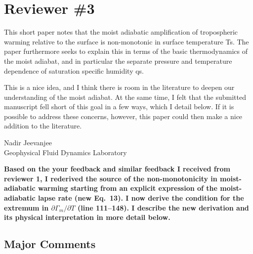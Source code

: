 \documentclass{article}
\begin{document}
\section*{Reviewer \#3}

This short paper notes that the moist adiabatic amplification of tropospheric warming relative to the surface is non-monotonic in surface temperature Ts. The paper furthermore seeks to explain this in terms of the basic thermodynamics of the moist adiabat, and in particular the separate pressure and temperature dependence of saturation specific humidity qs.

This is a nice idea, and I think there is room in the literature to deepen our understanding of the moist adiabat. At the same time, I felt that the submitted manuscript fell short of this goal in a few ways, which I detail below. If it is possible to address these concerns, however, this paper could then make a nice addition to the literature.

Nadir Jeevanjee \\
Geophysical Fluid Dynamics Laboratory

\textbf{Based on the your feedback and similar feedback I received from reviewer 1, I rederived the source of the non-monotonicity in moist-adiabatic warming starting from an explicit expression of the moist-adiabatic lapse rate (new Eq.~13). I now derive the condition for the extremum in $\partial\Gamma_m/\partial T$ (line 111--148). I describe the new derivation and its physical interpretation in more detail below.}

\subsection*{Major Comments}
\end{document}
